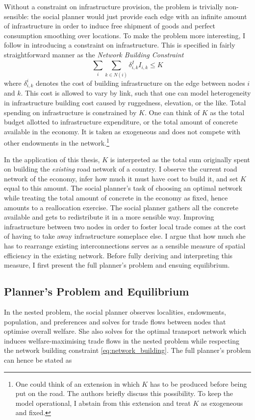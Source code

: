 \documentclass[11pt, oneside]{article}   	%
\begin{document}
Without a constraint on infrastructure provision, the problem is trivially non-sensible: the social planner would just provide each edge with an infinite amount of infrastructure in order to induce free shipment of goods and perfect consumption smoothing over locations. To make the problem more interesting, I follow \citeauthor{fajgelbaum_optimal_2017} in introducing a constraint on infrastructure. This is specified in fairly straightforward manner as the \emph{Network Building Constraint}
\begin{equation}
  \sum_{i}^{}\sum_{k\in N(i)}^{}\delta^{I}_{i,k}I_{i,k} \leq K
  \label{eq:network_building}
\end{equation}
where $\delta^{i}_{i,k}$ denotes the cost of building infrastructure on the edge between nodes $i$ and $k$. This cost is allowed to vary by link, such that one can model heterogeneity in infrastructure building cost caused by ruggedness, elevation, or the like. Total spending on infrastructure is constrained by $K$. One can think of $K$ as the total budget allotted to infrastructure expenditure, or the total amount of concrete available in the economy. It is taken as exogeneous and does not compete with other endowments in the network.\footnote{One could think of an extension in which $K$ has to be produced before being put on the road. The authors briefly discuss this possibility. To keep the model operational, I abstain from this extension and treat $K$ as exogeneous and fixed.}

In the application of this thesis, $K$ is interpreted as the total sum originally spent on building the \emph{existing} road network of a country. I observe the current road network of the economy, infer how much it must have cost to build it, and set $K$ equal to this amount. The social planner's task of choosing an optimal network while treating the total amount of concrete in the economy as fixed, hence amounts to a reallocation exercise. The social planner gathers all the concrete available and gets to redistribute it in a more sensible way. Improving infrastructure between two nodes in order to foster local trade comes at the cost of having to take away infrastructure someplace else. I argue that how much she has to rearrange existing interconnections serves as a sensible measure of spatial efficiency in the existing network. Before fully deriving and interpreting this measure, I first present the full planner's problem and ensuing equilibrium.

\subsection{Planner's Problem and Equilibrium}
In the nested problem, the social planner observes localities, endowments, population, and preferences and solves for trade flows between nodes that optimise overall welfare. She also solves for the optimal transport network which induces welfare-maximising trade flows in the nested problem while respecting the network building constraint \eqref{eq:network_building}. The full planner's problem can hence be stated as
\end{document}
